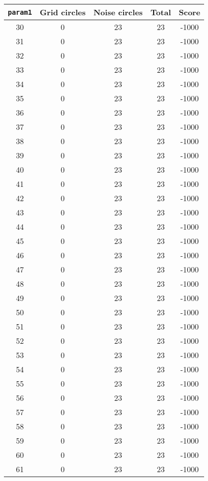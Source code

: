 \documentclass[letterpaper, 12pt]{article}
\begin{document}
\begin{longtable}{|c|c|c|c|c|}
\hline
\textbf{\texttt{param1}} & \textbf{Grid circles} & \textbf{Noise circles} & \textbf{Total} & \textbf{Score} \\
\hline
30 & 0 & 23 & 23 & -1000 \\
\hline
31 & 0 & 23 & 23 & -1000 \\
\hline
32 & 0 & 23 & 23 & -1000 \\
\hline
33 & 0 & 23 & 23 & -1000 \\
\hline
34 & 0 & 23 & 23 & -1000 \\
\hline
35 & 0 & 23 & 23 & -1000 \\
\hline
36 & 0 & 23 & 23 & -1000 \\
\hline
37 & 0 & 23 & 23 & -1000 \\
\hline
38 & 0 & 23 & 23 & -1000 \\
\hline
39 & 0 & 23 & 23 & -1000 \\
\hline
40 & 0 & 23 & 23 & -1000 \\
\hline
41 & 0 & 23 & 23 & -1000 \\
\hline
42 & 0 & 23 & 23 & -1000 \\
\hline
43 & 0 & 23 & 23 & -1000 \\
\hline
44 & 0 & 23 & 23 & -1000 \\
\hline
45 & 0 & 23 & 23 & -1000 \\
\hline
46 & 0 & 23 & 23 & -1000 \\
\hline
47 & 0 & 23 & 23 & -1000 \\
\hline
48 & 0 & 23 & 23 & -1000 \\
\hline
49 & 0 & 23 & 23 & -1000 \\
\hline
50 & 0 & 23 & 23 & -1000 \\
\hline
51 & 0 & 23 & 23 & -1000 \\
\hline
52 & 0 & 23 & 23 & -1000 \\
\hline
53 & 0 & 23 & 23 & -1000 \\
\hline
54 & 0 & 23 & 23 & -1000 \\
\hline
55 & 0 & 23 & 23 & -1000 \\
\hline
56 & 0 & 23 & 23 & -1000 \\
\hline
57 & 0 & 23 & 23 & -1000 \\
\hline
58 & 0 & 23 & 23 & -1000 \\
\hline
59 & 0 & 23 & 23 & -1000 \\
\hline
60 & 0 & 23 & 23 & -1000 \\
\hline
61 & 0 & 23 & 23 & -1000 \\

\end{longtable}
\end{document}
